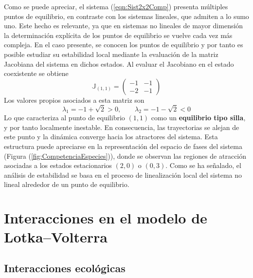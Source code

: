Como se puede apreciar, el sistema (\ref{eqn:Sist2x2Comp}) presenta múltiples puntos de equilibrio, en contraste con los sistemas lineales, que admiten a lo sumo uno. Este hecho es relevante, ya que en sistemas no lineales de mayor dimensión la determinación explícita de los puntos de equilibrio se vuelve cada vez más compleja. En el caso presente, se conocen los puntos de equilibrio y por tanto es posible estudiar su estabilidad local mediante la evaluación de la matriz Jacobiana del sistema en dichos estados. Al evaluar el Jacobiano en el estado coexistente se obtiene 
\begin{equation}\label{eqn:Jacobiano(1,1)}
	\mathbb{J}_{(1,1)}=\begin{pmatrix}
		-1 & -1\\
		-2 & -1
	\end{pmatrix}
\end{equation}
Los valores propios asociados a esta matriz son
$$\lambda_{1}=-1+\sqrt{2}>0,\qquad\lambda_2=-1-\sqrt{2}<0$$
Lo que caracteriza al punto de equilibrio $(1,1)$ como un \textbf{equilibrio tipo silla}, y por tanto localmente inestable. En consecuencia, las trayectorias se alejan de este punto y la dinámica converge hacia los atractores del sistema. Esta estructura puede apreciarse en la representación del espacio de fases del sistema (Figura (\ref{fig:CompetenciaEspecies})), donde se observan las regiones de atracción asociadas a los estados estacionarios $(2,0)$ o $(0,3)$. Como se ha señalado, el análisis de estabilidad se basa en el proceso de linealización local del sistema no lineal alrededor de un punto de equilibrio. 

\section{Interacciones en el modelo de Lotka--Volterra}

\subsection{Interacciones ecológicas}

